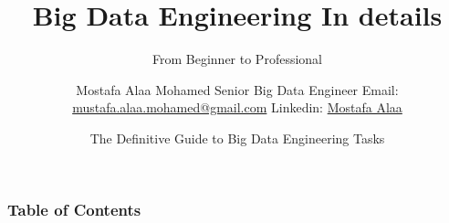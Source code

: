 \documentclass{beamer}
\title[Big Data Engineering In details] %
{Big Data Engineering In details}
\subtitle{From Beginner to Professional}
\author[Mostafa Alaa] %
{Mostafa Alaa Mohamed \newline Senior Big Data Engineer \newline Email: \href{mailto: mustafa.alaa.mohamed@gmail.com}{mustafa.alaa.mohamed@gmail.com} \newline Linkedin: \href{https://www.linkedin.com/in/mostafa-alaa-5120615b/}{Mostafa Alaa} \inst{1}}
\institute[] %
{
  \inst{1}%
  Big Data \& Analytics Department, Epam Systems
}
\date[\today] %
{The Definitive Guide to Big Data Engineering Tasks}
\begin{document}
\frame{\titlepage}


\begin{frame}[allowframebreaks]
\frametitle{Table of Contents}
\tableofcontents
\end{frame}

%

%


%
%
%
%
%
%
%
%
%
%
\end{document}
